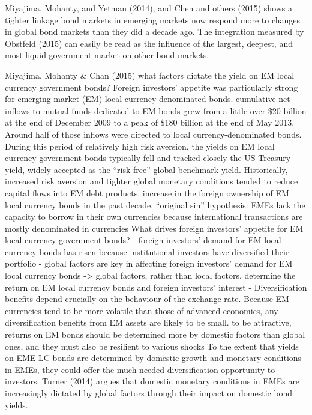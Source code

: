 Miyajima, Mohanty, and Yetman (2014), and Chen and others (2015) shows a tighter linkage bond markets in emerging markets now respond more to changes in global bond markets than they did a decade ago.
The integration measured by Obstfeld (2015) can easily be read as the influence of the largest, deepest, and most liquid government market on other bond markets.

Miyajima, Mohanty \& Chan (2015)
what factors dictate the yield on EM local currency government bonds?
Foreign investors' appetite was particularly strong for emerging market (EM) local currency denominated bonds.
cumulative net inflows to mutual funds dedicated to EM bonds grew from a little over \$20 billion at the end of December 2009 to a peak of \$180 billion at the end of May 2013. Around half of those inflows were directed to local currency-denominated bonds. During this period of relatively high risk aversion, the yields on EM local currency government bonds typically fell and tracked closely the US Treasury yield, widely accepted as the “risk-free” global benchmark yield.
Historically, increased risk aversion and tighter global monetary conditions tended to reduce capital flows into EM debt products.
increase in the foreign ownership of EM local currency bonds in the past decade.
“original sin” hypothesis: EMEs lack the capacity to borrow in their own currencies because international transactions are mostly denominated in currencies
What drives foreign investors' appetite for EM local currency government bonds?
- foreign investors' demand for EM local currency bonds has risen because institutional investors have diversified their portfolio
- global factors are key in affecting foreign investors' demand for EM local currency bonds -> global factors, rather than local factors, determine the return on EM local currency bonds and foreign investors' interest
- Diversification benefits depend crucially on the behaviour of the exchange rate. Because EM currencies tend to be more volatile than those of advanced economies, any diversification benefits from EM assets are likely to be small.
to be attractive, returns on EM bonds should be determined more by domestic factors than global ones, and they must also be resilient to various shocks
To the extent that yields on EME LC bonds are determined by domestic growth and monetary conditions in EMEs, they could offer the much needed diversification opportunity to investors.
Turner (2014) argues that domestic monetary conditions in EMEs are increasingly dictated by global factors through their impact on domestic bond yields.
